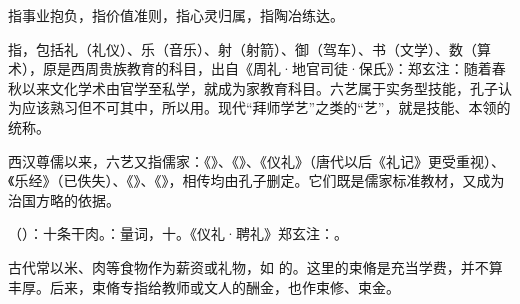 {
\item {}指事业抱负，指价值准则，指心灵归属，指陶冶练达。

\item {}指，包括礼（礼仪）、乐（音乐）、射（射箭）、御（驾车）、书（文学）、数（算术），原是西周贵族教育的科目，出自《周礼·地官司徒·保氏》：郑玄注：随着春秋以来文化学术由官学至私学，就成为家教育科目。六艺属于实务型技能，孔子认为应该熟习但不可其中，所以用。现代“拜师学艺”之类的“艺”，就是技能、本领的统称。

西汉尊儒以来，六艺又指儒家：《》、《》、《仪礼》（唐代以后《礼记》更受重视）、《乐经》（已佚失）、《》、《》，相传均由孔子删定。它们既是儒家标准教材，又成为治国方略的依据。
}
{}


{
\item {}（）：十条干肉。：量词，十。《仪礼·聘礼》郑玄注：。

古代常以米、肉等食物作为薪资或礼物，如  的。这里的束脩是充当学费，并不算丰厚。后来，束脩专指给教师或文人的酬金，也作束修、束金。
}
{}


